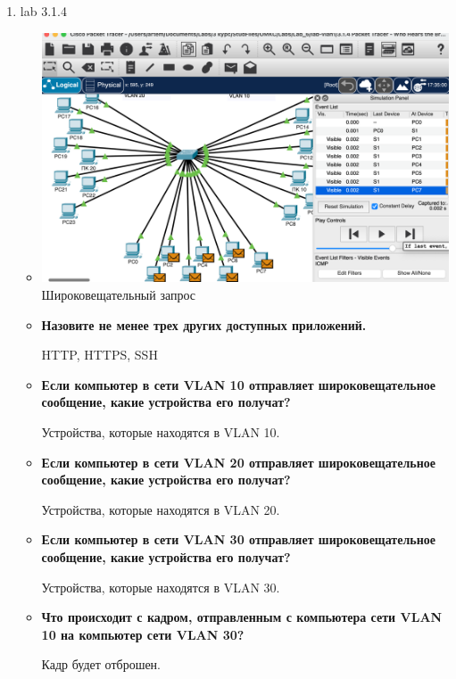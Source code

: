 \documentclass[a4paper,14pt]{extarticle}
\begin{document}
    \begin{enumerate}
        \item lab 3.1.4
        \begin{itemize}
            \item
                \begin{center}
                    \includegraphics[scale=0.4]{pics/3.1.4_1.png} 
                    Широковещательный запрос
                \end{center} 

            \item \textbf{Назовите не менее трех других доступных приложений.}\par
            HTTP, HTTPS, SSH

            \item \textbf{Если компьютер в сети VLAN 10 отправляет широковещательное сообщение, какие устройства его получат?}\par
            Устройства, которые находятся в VLAN 10.

            \item \textbf{Если компьютер в сети VLAN 20 отправляет широковещательное сообщение, какие устройства его получат?}\par
            Устройства, которые находятся в VLAN 20.

            \item \textbf{Если компьютер в сети VLAN 30 отправляет широковещательное сообщение, какие устройства его получат?}\par
            Устройства, которые находятся в VLAN 30.

            \item \textbf{Что происходит с кадром, отправленным с компьютера сети VLAN 10 на компьютер сети VLAN 30?}\par
            Кадр будет отброшен.


\end{itemize}
\end{enumerate}
\end{document}
